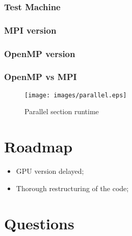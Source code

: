 \documentclass{beamer}
\begin{document}
\begin{minipage}{.45\textwidth}
\begin{frame}[plain]
	\frametitle{Test Machine}
		\begin{center}

			\begin{table}[!htp]
			\caption{Test machines}
			\label{tab:test machines}
			\end{table}
		\end{center}
\end{frame}
\end{minipage}

\begin{frame}[plain]
	\frametitle{MPI version}
	
\end{frame}

\begin{frame}[plain]
	\frametitle{OpenMP version}
	
\end{frame}


\begin{frame}
	\frametitle{OpenMP vs MPI}
	\begin{center}

	\begin{figure}[!htp]
		\texttt{[image: images/parallel.eps]}
		\caption{Parallel section runtime}
		\label{fig:roofline}
	\end{figure}
	\end{center}
\end{frame}


\section{Roadmap}
\begin{frame}
	\begin{center}
	\begin{itemize}
		\item GPU version delayed;
		\item Thorough restructuring of the code;
	\end{itemize}
	\end{center}
\end{frame}

\section{Questions}
\begin{frame}
	\titlepage
	
	
\end{frame}
\end{document}
